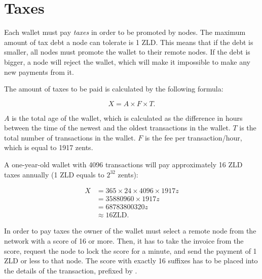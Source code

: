 \documentclass{main}
\begin{document}
\section{Taxes}\label{sec:taxes}

Each wallet must pay \emph{taxes} in order to be promoted by nodes.
The maximum amount of tax debt a node can tolerate is 1 ZLD. This means
that if the debt is smaller, all nodes must promote the wallet to their
remote nodes. If the debt is bigger, a node will reject the wallet,
which will make it impossible to make any new payments from it.

The amount of taxes to be paid is calculated by the following formula:

\begin{equation}
X = A \times F \times T.
\end{equation}

$A$ is the total age of the wallet,
which is calculated as the difference in hours between the time of the newest and
the oldest transactions in the wallet.
$T$ is the total number of transactions in the wallet.
$F$ is the fee per transaction/hour, which is equal to 1917 zents.

A one-year-old wallet with 4096 transactions will pay approximately 16 ZLD taxes annually
(1 ZLD equals to $2^{32}$ zents):

\begin{equation}
\begin{split}
X & = 365 \times 24 \times 4096 \times 1917z \\
  & = \text{35880960} \times 1917z \\
  & = \text{68783800320}z \\
  & \approx 16 \text{ZLD}.
\end{split}
\end{equation}

In order to pay taxes the owner of the wallet must select a remote
node from the network with a score of 16 or more. Then, it has to
take the invoice from the score, request the node to lock the score
for a minute, and send the payment of 1 ZLD or less
to that node. The score with exactly 16 suffixes
has to be placed into the details of the transaction,
prefixed by .
\end{document}
